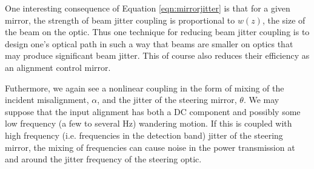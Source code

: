 One interesting consequence of Equation \ref{eqn:mirrorjitter} is that for a given mirror, the strength of beam jitter coupling is proportional to $w(z)$, the size of the beam on the optic. %
Thus one technique for reducing beam jitter coupling is to design one's optical path in such a way that beams are smaller on optics that may produce significant beam jitter. %
This of course also reduces their efficiency as an alignment control mirror.

Futhermore, we again see a nonlinear coupling in the form of mixing of the incident misalignment, $\alpha$, and the jitter of the steering mirror, $\theta$. %
We may suppose that the input alignment has both a DC component and possibly some low frequency (a few to several Hz) wandering motion. %
If this is coupled with high frequency (i.e. %
frequencies in the detection band) jitter of the steering mirror, the mixing of frequencies can cause noise in the power transmission at and around the jitter frequency of the steering optic.

